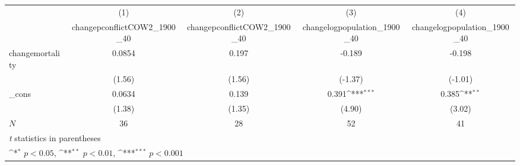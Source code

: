 {
\def\sym#1{\ifmmode^{#1}\else\(^{#1}\)\fi}
\begin{tabular}{l*{4}{c}}
\hline\hline
            &\multicolumn{1}{c}{(1)}&\multicolumn{1}{c}{(2)}&\multicolumn{1}{c}{(3)}&\multicolumn{1}{c}{(4)}\\
            &\multicolumn{1}{c}{changepconflictCOW2\_1900\_40}&\multicolumn{1}{c}{changepconflictCOW2\_1900\_40}&\multicolumn{1}{c}{changelogpopulation\_1900\_40}&\multicolumn{1}{c}{changelogpopulation\_1900\_40}\\
\hline
changemortality&      0.0854         &       0.197         &      -0.189         &      -0.198         \\
            &      (1.56)         &      (1.56)         &     (-1.37)         &     (-1.01)         \\
[1em]
\_cons      &      0.0634         &       0.139         &       0.391\sym{***}&       0.385\sym{**} \\
            &      (1.38)         &      (1.35)         &      (4.90)         &      (3.02)         \\
\hline
\(N\)       &          36         &          28         &          52         &          41         \\
\hline\hline
\multicolumn{5}{l}{\footnotesize \textit{t} statistics in parentheses}\\
\multicolumn{5}{l}{\footnotesize \sym{*} \(p<0.05\), \sym{**} \(p<0.01\), \sym{***} \(p<0.001\)}\\
\end{tabular}
}
